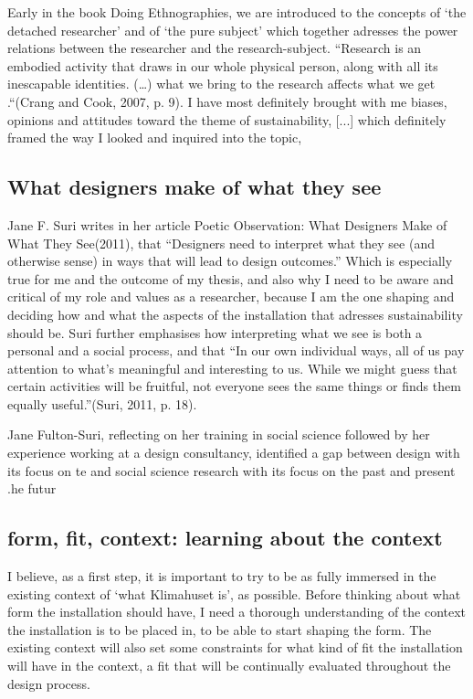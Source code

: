 Early in the book Doing Ethnographies, we are introduced to the concepts of ‘the detached researcher’ and of ‘the pure subject’ which together adresses the power relations between the researcher and the research-subject. “Research is an embodied activity that draws in our whole physical person, along with all its inescapable identities. (…) what we bring to the research affects what we get .“(Crang and Cook, 2007, p. 9). I have most definitely brought with me biases, opinions and attitudes toward the theme of sustainability, [...] which definitely framed the way I looked and inquired into the topic,


\subsection{What designers make of what they see}
Jane F. Suri writes in her article Poetic Observation: What Designers Make of What They See(2011), that “Designers need to interpret what they see (and otherwise sense) in ways that will lead to design outcomes.” Which is especially true for me and the outcome of my thesis, and also why I need to be aware and critical of my role and values as a researcher, because  I am the one shaping and deciding how and what the aspects of the installation that adresses sustainability should be. Suri further emphasises how interpreting what we see is both a personal and a social process, and that “In our own individual ways, all of us pay attention to what’s meaningful and interesting to us. While we might guess that certain activities will be fruitful, not everyone sees the same things or finds them equally useful.”(Suri, 2011, p. 18).

Jane Fulton-Suri, reflecting on her training in social science followed by her experience working at a design consultancy, identified a gap between design with its focus on te and social science research with its focus on the past and present \autocite[p. 167]{zimmerman_research_2014}.he futur



\subsection{form, fit, context: learning about the context }
I believe, as a first step, it is important to try to be as fully immersed in the existing context of ‘what Klimahuset is’, as possible. Before thinking about what form the installation should have, I need a thorough understanding of the context the installation is to be placed in, to be able to start shaping the form. The existing context will also set some constraints for what kind of fit the installation will have in the context, a fit that will be continually evaluated throughout the design process. 

